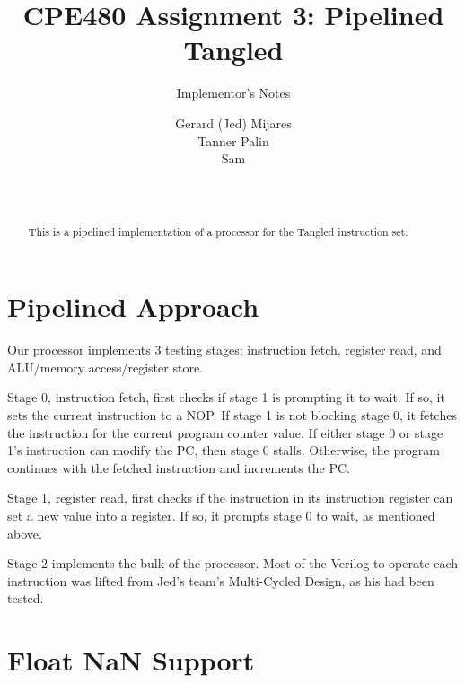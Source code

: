 \documentclass{sig-alternate-05-2015}
\begin{document}

\title{CPE480 Assignment 3: Pipelined Tangled }
\subtitle{Implementor's Notes}

\author{
Gerard (Jed) Mijares\\
Tanner Palin\\
Sam\\
       \\
       \\
}

\maketitle
\begin{abstract}
This is a pipelined implementation of a processor for the Tangled instruction set. 
\end{abstract}

\section{Pipelined Approach}

Our processor implements 3 testing stages: instruction fetch, register read, and ALU/memory access/register store.

Stage 0, instruction fetch, first checks if stage 1 is prompting it to wait. If so, it sets the current instruction to a NOP. If stage 1 is not blocking stage 0, it fetches the instruction for the current program counter value. If either stage 0 or stage 1's instruction can modify the PC, then stage 0 stalls. Otherwise, the program continues with the fetched instruction and increments the PC.

Stage 1, register read, first checks if the instruction in its instruction register can set a new value into a register. If so, it prompts stage 0 to wait, as mentioned above.

Stage 2 implements the bulk of the processor. Most of the Verilog to operate each instruction was lifted from Jed's team's Multi-Cycled Design, as his had been tested.

\vfill\pagebreak

\section{Float NaN Support}
\end{document}

